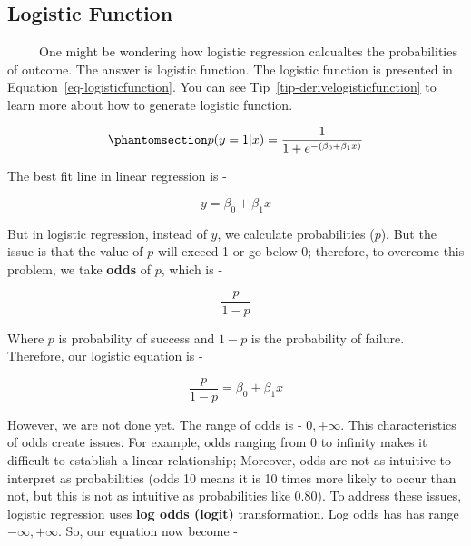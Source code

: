 \documentclass[
  letterpaper,
  DIV=11,
  numbers=noendperiod]{scrreprt}
\newcounter{quartocallouttipno}
\newcommand{\quartocallouttip}[1]{\refstepcounter{quartocallouttipno}\label{#1}}
\begin{document}
\subsection{Logistic Function}\label{logistic-function}

~~~~~One might be wondering how logistic regression calcualtes the
probabilities of outcome. The answer is logistic function. The logistic
function is presented in Equation~\ref{eq-logisticfunction}. You can see
Tip~\ref{tip-derivelogisticfunction} to learn more about how to generate
logistic function.

\begin{equation}\protect\phantomsection\label{eq-logisticfunction}{ 
p(y=1|x) = \frac{1}{1 + e^{-(\beta_0 + \beta_1x)}}
 }\end{equation}

\begin{tcolorbox}[enhanced jigsaw, arc=.35mm, bottomrule=.15mm, bottomtitle=1mm, breakable, colback=white, colbacktitle=quarto-callout-tip-color!10!white, colframe=quarto-callout-tip-color-frame, coltitle=black, left=2mm, leftrule=.75mm, opacityback=0, opacitybacktitle=0.6, rightrule=.15mm, title=\textcolor{quarto-callout-tip-color}{\faLightbulb}\hspace{0.5em}{Tip \ref*{tip-derivelogisticfunction}: Derivation of Logistic Function}, titlerule=0mm, toprule=.15mm, toptitle=1mm]

\quartocallouttip{tip-derivelogisticfunction} 

The best fit line in linear regression is -

\[ 
y = \beta_0 + \beta_1x
\]

But in logistic regression, instead of \(y\), we calculate probabilities
(\(p\)). But the issue is that the value of \(p\) will exceed 1 or go
below 0; therefore, to overcome this problem, we take \textbf{odds} of
\(p\), which is -

\[
\frac{p}{1-p}
\]

Where \(p\) is probability of success and \(1-p\) is the probability of
failure. Therefore, our logistic equation is -

\[
\frac{p}{1-p} = \beta_0 + \beta_1x
\]

However, we are not done yet. The range of odds is - \(0, +\infty\).
This characteristics of odds create issues. For example, odds ranging
from 0 to infinity makes it difficult to establish a linear
relationship; Moreover, odds are not as intuitive to interpret as
probabilities (odds 10 means it is 10 times more likely to occur than
not, but this is not as intuitive as probabilities like 0.80). To
address these issues, logistic regression uses \textbf{log odds (logit)}
transformation. Log odds has has range \(-\infty,+\infty\). So, our
equation now become -


\end{tcolorbox}
\end{document}
